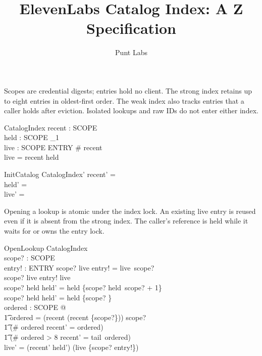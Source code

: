 \documentclass[a4paper,10pt,fleqn]{article}
\begin{document}
\title{ElevenLabs Catalog Index: A Z Specification}
\author{Punt Labs}
\maketitle

Scopes are credential digests; entries hold no client. The strong index
retains up to eight entries in oldest-first order. The weak index also
tracks entries that a caller holds after eviction. Isolated lookups and raw
IDs do not enter either index.

\begin{zed}
\end{zed}

\begin{schema}{CatalogIndex}
  recent : \iseq SCOPE \\
  held : SCOPE \pfun \nat_1 \\
  live : SCOPE \pinj ENTRY
\where
  \# recent  \\
  \dom live = \ran recent \cup \dom held
\end{schema}

\begin{schema}{InitCatalog}
  CatalogIndex'
\where
  recent' = \langle \rangle \\
  held' = \emptyset \\
  live' = \emptyset
\end{schema}

Opening a lookup is atomic under the index lock. An existing live entry is
reused even if it is absent from the strong index. The caller's reference is
held while it waits for or owns the entry lock.

\begin{schema}{OpenLookup}
  \Delta CatalogIndex \\
  scope? : SCOPE \\
  entry! : ENTRY
\where
  scope? \in \dom live \implies entry! = live~scope? \\
  scope? \notin \dom live \implies entry! \notin \ran live \\
  scope? \in \dom held \implies
    held' = held \oplus \{scope? \mapsto held~scope? + 1\} \\
  scope? \notin \dom held \implies
    held' = held \cup \{scope? \} \\
  \exists ordered : \iseq SCOPE @ \\
  \t1 ordered = (recent \filter (\ran recent \setminus \{scope?\}))
    \cat \langle scope? \rangle \land \\
  \t1 (\# ordered  \implies recent' = ordered) \land \\
  \t1 (\# ordered > 8 \implies recent' = tail~ordered) \\
  live' = (\ran recent' \cup \dom held') \dres
    (live \oplus \{scope? \mapsto entry!\})
\end{schema}
\end{document}
